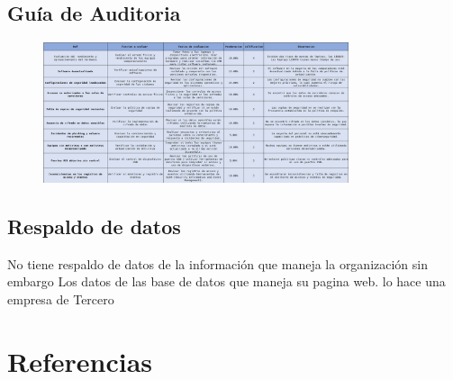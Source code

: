 \documentclass[12pt,a4paper]{article}
\begin{document}
\subsection{Guía de Auditoria }
\begin{figure}[!htb]
    \centering
    \includegraphics[width=0.8\textwidth]{images/guia.png}
    
\end{figure} 
\FloatBarrier 
\subsection{Respaldo de datos}
No tiene respaldo de datos de la información que maneja la organización sin embargo 
Los datos de las base de datos que maneja su pagina web. lo hace una empresa de Tercero

\newpage 



\newpage
\cite{prueba}

\section{Referencias}


\end{document}
